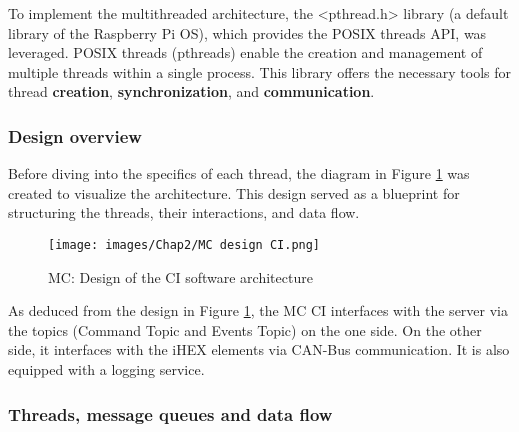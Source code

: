 To implement the multithreaded architecture, the <pthread.h> library (a default library of the Raspberry Pi OS), which provides the POSIX threads API, was leveraged. POSIX threads (pthreads) enable the creation and management of multiple threads within a single process. This library offers the necessary tools for thread \textbf{creation}, \textbf{synchronization}, and \textbf{communication}. \cite{R24}

\subsubsection{Design overview}

Before diving into the specifics of each thread, the diagram in Figure \ref{MC: design CI} was created to visualize the architecture. This design served as a blueprint for structuring the threads, their interactions, and data flow.

\begin{figure}[H]
\begin{center}
\texttt{[image: images/Chap2/MC design CI.png]}\\
\caption{MC: Design of the CI software architecture}
\label{MC: design CI}
\end{center}
\end{figure}

As deduced from the design in Figure \ref{MC: design CI}, the MC CI interfaces with the server via the topics (Command Topic and Events Topic) on the one side. On the other side, it interfaces with the iHEX elements via CAN-Bus communication. It is also equipped with a logging service.

\subsubsection{Threads, message queues and data flow}

